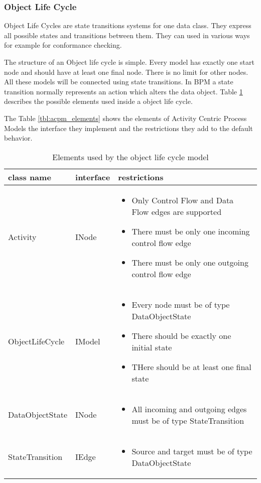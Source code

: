 \subsubsection{Object Life Cycle}

Object Life Cycles are state transitions systems for one data class.
They express all possible states and transitions between them.
They can used in various ways for example for conformance checking.

The structure of an Object life cycle is simple.
Every model has exactly one start node and should have at least one final node.
There is no limit for other nodes.
All these models will be connected using state transitions.
In BPM a state transition normally represents an action which alters the data object.
Table \ref{tbl:olc_elements} describes the possible elements used inside a object life cycle.

The Table \ref{tbl:acpm_elements} shows the elements of Activity Centric Process Models the interface they implement and the restrictions they add to the default behavior.

\begin{table}[h]
	\centering
	\begin{tabular}{|l|l|p{10cm}|}
		\hline
		\textbf{class name} & \textbf{interface} & \textbf{restrictions}\\
		\hline
		Activity & INode & \begin{itemize}
					\item Only Control Flow and Data Flow edges are supported
					\item There must be only one incoming control flow edge
					\item There must be only one outgoing control flow edge
				\end{itemize}\\
		\hline
		ObjectLifeCycle & IModel & \begin{itemize}
			\item Every node must be of type DataObjectState
			\item There should be exactly one initial state
			\item THere should be at least one final state
		\end{itemize}\\
		\hline
		DataObjectState & INode & \begin{itemize}
									\item All incoming and outgoing edges must be of type StateTransition
								\end{itemize}\\
		\hline
		StateTransition & IEdge & \begin{itemize}
									\item Source and target must be of type DataObjectState
								\end{itemize}\\
		\hline
	\end{tabular}
	\caption{Elements used by the object life cycle model}
	\label{tbl:olc_elements}
\end{table}

